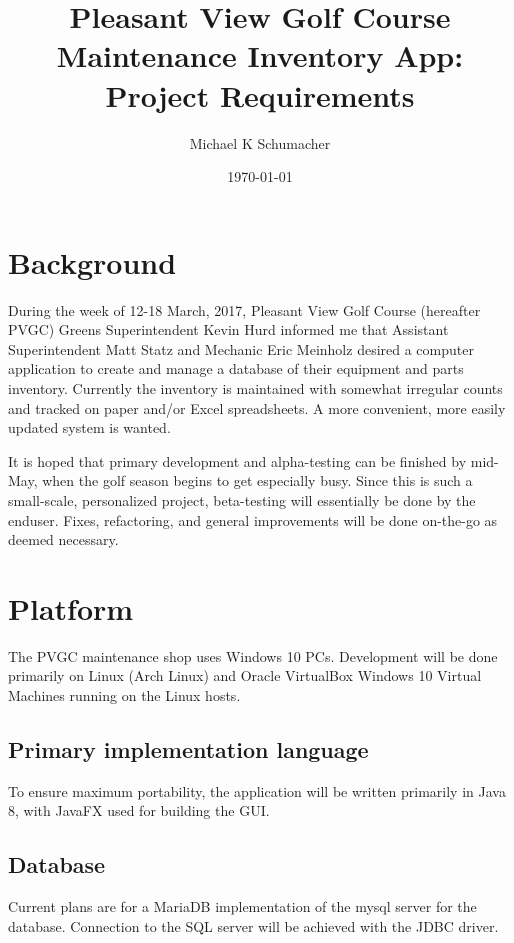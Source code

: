 \documentclass[titlepage]{article}
\title{Pleasant View Golf Course Maintenance Inventory App: \\ Project Requirements}
\author{Michael K Schumacher}
\date{\today}
\begin{document}
    \maketitle
    
    \vspace{20pt}
    
    \section{Background}
        During the week of 12-18 March, 2017, Pleasant View Golf Course (hereafter PVGC) Greens
        Superintendent Kevin Hurd informed me that Assistant Superintendent Matt Statz and 
        Mechanic Eric Meinholz desired a computer application to create and manage a database of
        their equipment and parts inventory. Currently the inventory is maintained with somewhat
        irregular counts and tracked on paper and/or Excel spreadsheets. A more convenient, more
        easily updated system is wanted.
        
        It is hoped that primary development and alpha-testing can be finished by mid-May, when
        the golf season begins to get especially busy. Since this is such a small-scale,
        personalized project, beta-testing will essentially be done by the enduser. Fixes,
         refactoring, and general improvements will be done on-the-go as deemed necessary.
        
    \section{Platform}
        The PVGC maintenance shop uses Windows 10 PCs. Development will be done primarily on Linux
        (Arch Linux) and Oracle VirtualBox Windows 10 Virtual Machines running on the Linux hosts.
        
        \subsection{Primary implementation language}
            To ensure maximum portability, the application will be written primarily in Java 8,
            with JavaFX used for building the GUI.
        
        \subsection{Database}
            Current plans are for a MariaDB implementation of the mysql server for the database.
            Connection to the SQL server will be achieved with the JDBC driver.
    
\end{document}
